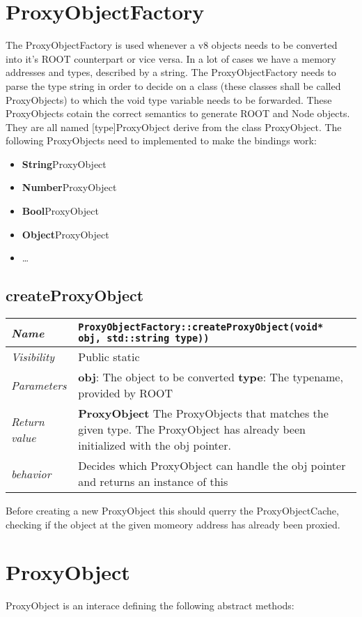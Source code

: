 \chapter{ProxyObjectFactory}
The ProxyObjectFactory is used whenever a v8 objects needs to be converted into it's ROOT counterpart or vice versa.
In a lot of cases we have a memory addresses and types, described by a string. The ProxyObjectFactory needs to parse the type string in order to decide on a class (these classes shall be called ProxyObjects) to which the void type variable needs to be forwarded.
These ProxyObjects cotain the correct semantics to generate ROOT and Node objects. They are all named [type]ProxyObject derive from the class ProxyObject.
The following ProxyObjects need to implemented to make the bindings work:
\begin{itemize}
  \item \textbf{String}ProxyObject
  \item \textbf{Number}ProxyObject
  \item \textbf{Bool}ProxyObject
  \item \textbf{Object}ProxyObject
  \item \dots
\end{itemize}
\section{createProxyObject}
\begin{longtable}{p{3cm} @{\hskip 1cm} p{12cm}}
  \hline
  \textit{Name} & \texttt{ProxyObjectFactory::createProxyObject(void* obj, std::string type))} \\
  \hline
  \textit{Visibility} & Public static \\
  \hline
  \textit{Parameters} & \textbf{obj}: The object to be converted
   \textbf{type}: The typename, provided by ROOT \\
  \hline
  \textit{Return value} & \textbf{ProxyObject} The ProxyObjects that matches the given type. The ProxyObject has already been initialized with the obj pointer. \\
  \hline
  \textit{behavior} & Decides which ProxyObject can handle the obj pointer and returns an instance of this \\
  \hline
\end{longtable}
Before creating a new ProxyObject this should querry the ProxyObjectCache, checking if the object at the given momeory address has already been proxied.
\chapter{ProxyObject}
ProxyObject is an interace defining the following abstract methods:

